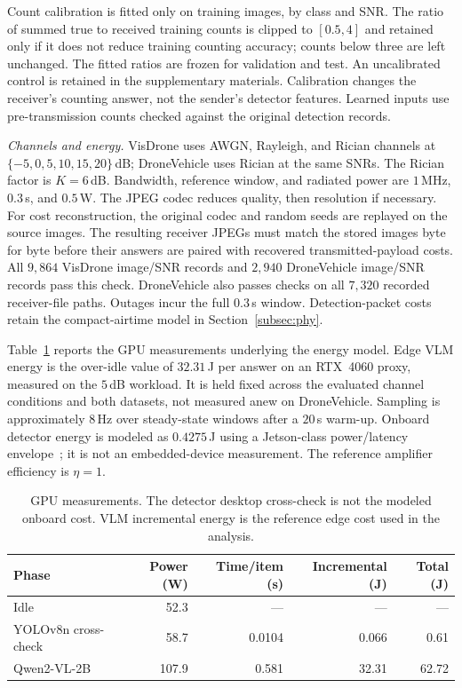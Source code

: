 Count calibration is fitted only on training images, by class and
SNR. The ratio of summed true to received training counts is clipped
to $[0.5,4]$ and retained only if it does not reduce training counting accuracy; counts below
three are left unchanged. The fitted ratios are frozen for validation
and test. An uncalibrated control is retained in the supplementary
materials. Calibration changes the receiver's counting answer, not
the sender's detector features. Learned inputs use pre-transmission
counts checked against the original detection records.

\emph{Channels and energy.}\label{subsec:energy-exp}
VisDrone uses AWGN, Rayleigh, and Rician channels at
$\{-5,0,5,10,15,20\}$\,dB; DroneVehicle uses Rician at the same SNRs.
The Rician factor is $K=6$\,dB. Bandwidth, reference window, and
radiated power are $1$\,MHz, $0.3$\,s, and $0.5$\,W.
The JPEG codec reduces quality, then resolution if necessary.
For cost reconstruction, the original codec and random seeds are
replayed on the source images. The resulting receiver JPEGs must
match the stored images byte for byte before their answers are
paired with recovered transmitted-payload costs.
All $9{,}864$ VisDrone image/SNR records and $2{,}940$
DroneVehicle image/SNR records pass this check. DroneVehicle also
passes checks on all $7{,}320$ recorded receiver-file paths.
Outages incur the full $0.3$\,s window. Detection-packet costs retain
the compact-airtime model in Section~\ref{subsec:phy}.

Table~\ref{tab:power} reports the GPU measurements underlying the
energy model. Edge VLM energy is the over-idle value of $32.31$\,J
per answer on an RTX~4060 proxy, measured on the $5$\,dB workload.
It is held fixed across the evaluated channel conditions and both
datasets, not measured anew on DroneVehicle. Sampling is approximately
$8$\,Hz over steady-state windows after a $20$\,s warm-up.
Onboard detector energy is modeled as $0.4275$\,J using a
Jetson-class power/latency envelope~\cite{nvidia2024orinnano};
it is not an embedded-device measurement. The reference amplifier
efficiency is $\eta=1$.

\begin{table}[t]\centering
\caption{GPU measurements. The detector desktop cross-check is not
the modeled onboard cost. VLM incremental energy is the reference
edge cost used in the analysis.}\label{tab:power}
\footnotesize
\begin{tabular}{@{}lrrrr@{}}\toprule
Phase & Power (W) & Time/item (s) & Incremental (J) & Total (J)\\
\midrule
Idle & 52.3 & --- & --- & ---\\
YOLOv8n cross-check & 58.7 & 0.0104 & 0.066 & 0.61\\
Qwen2-VL-2B & 107.9 & 0.581 & 32.31 & 62.72\\
\bottomrule\end{tabular}
\end{table}


